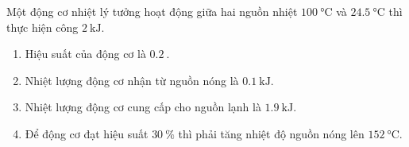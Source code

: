 \begin{ex}
	Một động cơ nhiệt lý tưởng hoạt động giữa hai nguồn nhiệt $\SI{100}{\celsius}$ và $\SI{24.5}{\celsius}$ thì thực hiện công $\SI{2}{\kilo\joule}$.
	\begin{enumerate}[label=\alph*)]
		\item Hiệu suất của động cơ là $\SI{0.2}{}$.
		\item Nhiệt lượng động cơ nhận từ nguồn nóng là $\SI{0.1}{\kilo\joule}$.
		\item Nhiệt lượng động cơ cung cấp cho nguồn lạnh là $\SI{1.9}{\kilo\joule}$.
		\item Để động cơ đạt hiệu suất $\SI{30}{\percent}$ thì phải tăng nhiệt độ nguồn nóng lên $\SI{152}{\celsius}$.
	\end{enumerate}
	
\end{ex}
